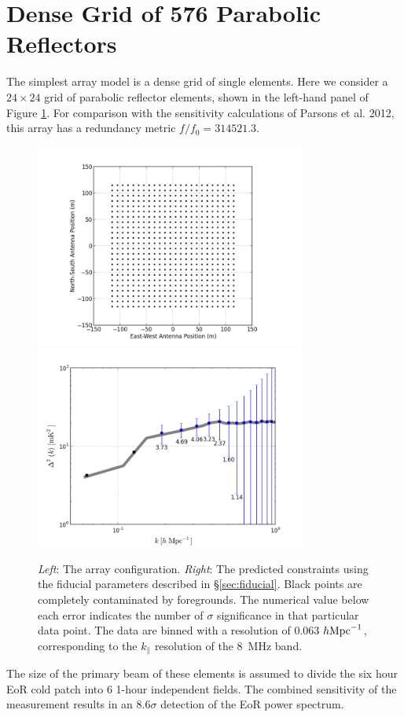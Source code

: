 \documentclass[preprint]{aastex}
\begin{document}
\section{Dense Grid of 576 Parabolic Reflectors}

The simplest array model is a dense grid of single elements.  Here we consider 
a $24\times24$ grid of parabolic reflector elements, shown in the left-hand
panel of Figure \ref{fig:p24x24}.  For comparison with the sensitivity
calculations of Parsons et al. 2012, this array has a redundancy metric
$f/f_0 = 314521.3$.  

\begin{figure}[ht]
\centering
\includegraphics[width=3.5in,trim=2cm 0cm 0cm 0cm]{figures/g24x24.png}\includegraphics[width=3.5in,trim=2cm 0cm 0cm 0cm]{figures/g24x24-sense.png}
\caption{\emph{Left}: The array configuration.  \emph{Right}: The predicted 
constraints using the fiducial parameters described in \S\ref{sec:fiducial}.  
Black points are completely contaminated by foregrounds.
The numerical value below each error indicates the number of $\sigma$
significance in that particular data point.
The data are binned with a resolution of 0.063 $h\rm{Mpc}^{-1}$, corresponding
to the $k_\parallel$ resolution of the 8~MHz band.}
\label{fig:p24x24}
\end{figure}
The size of the primary 
beam of these elements is assumed to divide the six hour EoR cold patch into
6 1-hour independent fields.  The combined sensitivity of the measurement
results in an 8.6$\sigma$ detection of the EoR power spectrum.
\end{document}
